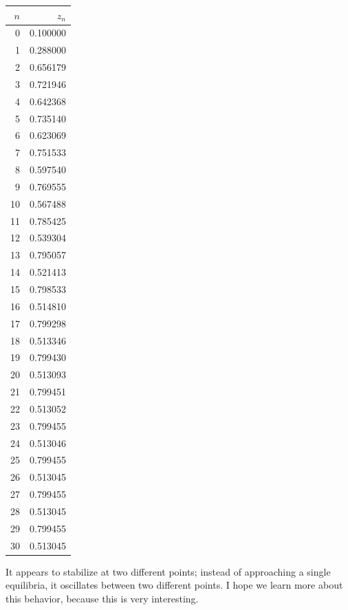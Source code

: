 \documentclass[11pt, letterpaper]{report}
\begin{document}
\begin{center}
\begin{tabular}{rr}
\toprule
$n$ & $z_n$ \\
\midrule
0 & 0.100000 \\
1 & 0.288000 \\
2 & 0.656179 \\
3 & 0.721946 \\
4 & 0.642368 \\
5 & 0.735140 \\
6 & 0.623069 \\
7 & 0.751533 \\
8 & 0.597540 \\
9 & 0.769555 \\
10 & 0.567488 \\
11 & 0.785425 \\
12 & 0.539304 \\
13 & 0.795057 \\
14 & 0.521413 \\
15 & 0.798533 \\
16 & 0.514810 \\
17 & 0.799298 \\
18 & 0.513346 \\
19 & 0.799430 \\
20 & 0.513093 \\
21 & 0.799451 \\
22 & 0.513052 \\
23 & 0.799455 \\
24 & 0.513046 \\
25 & 0.799455 \\
26 & 0.513045 \\
27 & 0.799455 \\
28 & 0.513045 \\
29 & 0.799455 \\
30 & 0.513045 \\
\bottomrule
\end{tabular}
\end{center}
It appears to stabilize at two different points; instead of approaching a single equilibria, it oscillates between two different points. I hope we learn more about this behavior, because this is very interesting.
\end{document}
